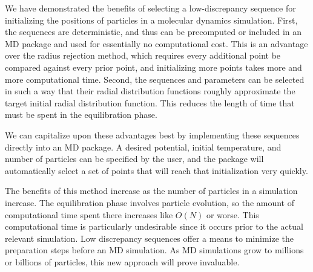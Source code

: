 \documentclass{article}
\begin{document}
We have demonstrated the benefits of selecting a low-discrepancy sequence for initializing the positions of particles in a molecular dynamics simulation. First, the sequences are deterministic, and thus can be precomputed or included in an MD package and used for essentially no computational cost. This is an advantage over the radius rejection method, which requires every additional point be compared against every prior point, and initializing more points takes more and more computational time. Second, the sequences and parameters can be selected in such a way that their radial distribution functions roughly approximate the target initial radial distribution function. This reduces the length of time that must be spent in the equilibration phase.

We can capitalize upon these advantages best by implementing these sequences directly into an MD package. A desired potential, initial temperature, and number of particles can be specified by the user, and the package will automatically select a set of points that will reach that initialization very quickly.

The benefits of this method increase as the number of particles in a simulation increase. The equilibration phase involves particle evolution, so the amount of computational time spent there increases like $O(N)$ or worse. This computational time is particularly undesirable since it occurs prior to the actual relevant simulation. Low discrepancy sequences offer a means to minimize the preparation steps before an MD simulation. As MD simulations grow to millions or billions of particles, this new approach will prove invaluable.

\newpage


\end{document}
